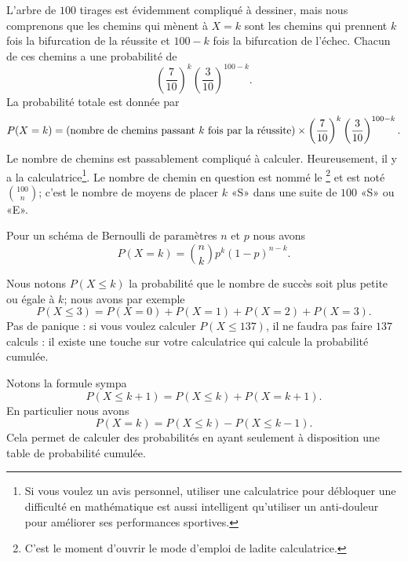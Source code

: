 L'arbre de \( 100\) tirages est évidemment compliqué à dessiner, mais nous comprenons que les chemins qui mènent à \( X=k\) sont les chemins qui prennent \( k\) fois la bifurcation de la réussite et \( 100-k\) fois la bifurcation de l'échec. Chacun de ces chemins a une probabilité de
\begin{equation}
    \left( \frac{ 7 }{ 10 } \right)^{k}\left( \frac{ 3 }{ 10 } \right)^{100-k}.
\end{equation}
La probabilité totale est donnée par
\begin{equation}
    P(X=k)=(\text{nombre de chemins passant \( k\) fois par la réussite})\times \left( \frac{ 7 }{ 10 } \right)^k\left( \frac{ 3 }{ 10 } \right)^{100-k}.
\end{equation}
Le nombre de chemins est passablement compliqué à calculer. Heureusement, il y a la calculatrice\footnote{Si vous voulez un avis personnel, utiliser une calculatrice pour débloquer une difficulté en mathématique est aussi intelligent qu'utiliser un anti-douleur pour améliorer ses performances sportives.}. Le nombre de chemin en question est nommé le \footnote{C'est le moment d'ouvrir le mode d'emploi de ladite calculatrice.} et est noté \( {100\choose n}\); c'est le nombre de moyens de placer \( k\) «S» dans une suite de \( 100\) «S» ou «E».

\begin{Aretenir}
    Pour un schéma de Bernoulli de paramètres \( n\) et \( p\) nous avons
    \begin{equation}
        P(X=k)={n\choose k}p^{k}(1-p)^{n-k}.
    \end{equation}
\end{Aretenir}

Nous notons \( P(X\leq k)\) la probabilité que le nombre de succès soit plus petite ou égale à \( k\); nous avons par exemple
\begin{equation}
    P(X\leq 3)=P(X=0)+P(X=1)+P(X=2)+P(X=3).
\end{equation}
Pas de panique : si vous voulez calculer \( P(X\leq 137)\), il ne faudra pas faire \( 137\) calculs : il existe une touche sur votre calculatrice qui calcule la probabilité cumulée.

Notons la formule sympa
\begin{equation}
    P(X\leq k+1)=P(X\leq k)+P(X=k+1).
\end{equation}
En particulier nous avons
\begin{equation}
    P(X=k)=P(X\leq k)-P(X\leq k-1).
\end{equation}
Cela permet de calculer des probabilités en ayant seulement à disposition une table de probabilité cumulée.

